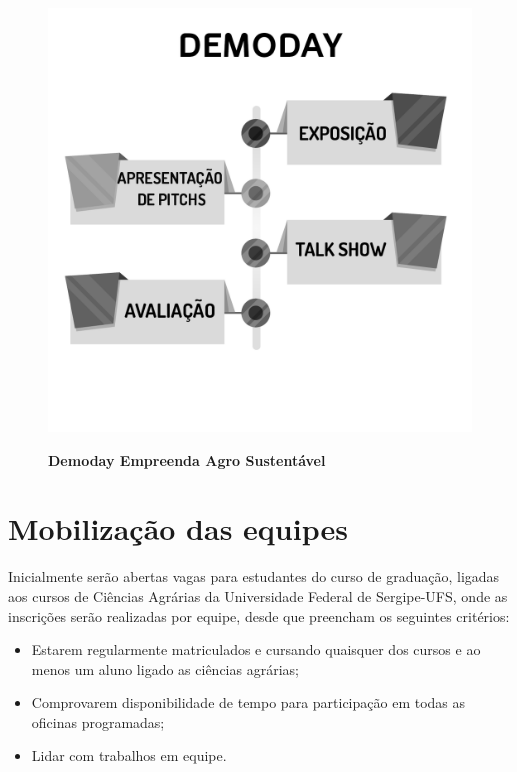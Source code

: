 \begin{figure}[h!]
\centering
\caption{\textbf{Demoday Empreenda Agro Sustentável}}
\includegraphics[scale=0.4]{Imagens/workshop-04.png}
\label{figura_33}
\end{figure}



\section{Mobilização das equipes}

Inicialmente serão abertas vagas para estudantes do curso de graduação, ligadas aos cursos de Ciências Agrárias da Universidade Federal de Sergipe-UFS, onde as inscrições serão realizadas por equipe, desde que preencham os seguintes critérios:

	
\begin{itemize}
\item{Estarem regularmente matriculados e cursando quaisquer dos cursos e ao menos um aluno ligado as ciências agrárias;}
\item{Comprovarem disponibilidade de tempo para participação em todas as oficinas programadas;}
\item{Lidar com trabalhos em equipe.}
\end{itemize}

